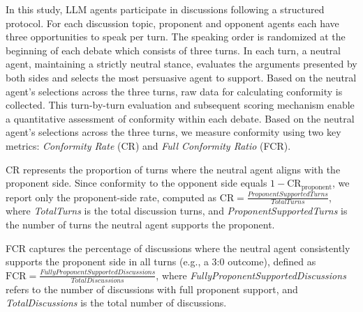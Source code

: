 \documentclass[11pt]{article}
\begin{document}


In this study, LLM agents participate in discussions following a structured protocol. For each discussion topic, proponent and opponent agents each have three opportunities to speak per turn. The speaking order is randomized at the beginning of each debate which consists of three turns. In each turn, a neutral agent, maintaining a strictly neutral stance, evaluates the arguments presented by both sides and selects the most persuasive agent to support. Based on the neutral agent’s selections across the three turns, raw data for calculating conformity is collected. This turn-by-turn evaluation and subsequent scoring mechanism enable a quantitative assessment of conformity within each debate. Based on the neutral agent’s selections across the three turns, we measure conformity using two key metrics: \textit{Conformity Rate} (CR) and \textit{Full Conformity Ratio} (FCR).  

CR represents the proportion of turns where the neutral agent aligns with the proponent side. Since conformity to the opponent side equals \(1 - \text{CR}_{\text{proponent}}\), we report only the proponent-side rate, computed as \( \text{CR} = \frac{\textit{ProponentSupportedTurns}}{\textit{TotalTurns}} \), where \textit{TotalTurns} is the total discussion turns, and \textit{ProponentSupportedTurns} is the number of turns the neutral agent supports the proponent.  

FCR captures the percentage of discussions where the neutral agent consistently supports the proponent side in all turns (e.g., a 3:0 outcome), defined as \( \text{FCR} = \frac{\textit{FullyProponentSupportedDiscussions}}{\textit{TotalDiscussions}} \), where \textit{FullyProponentSupportedDiscussions} refers to the number of discussions with full proponent support, and \textit{TotalDiscussions} is the total number of discussions.

\end{document}
